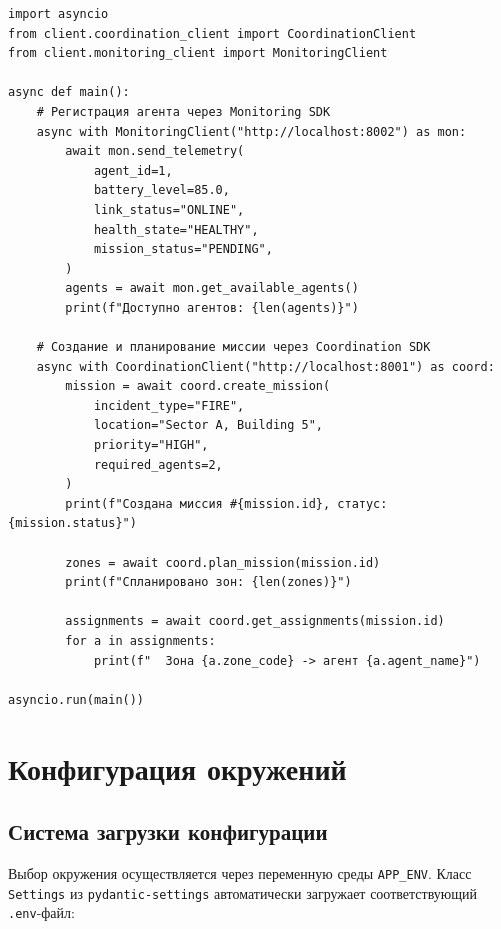 \documentclass[12pt,a4paper]{article}
\begin{document}
\begin{lstlisting}[caption={Использование CoordinationClient}]
import asyncio
from client.coordination_client import CoordinationClient
from client.monitoring_client import MonitoringClient

async def main():
    # Регистрация агента через Monitoring SDK
    async with MonitoringClient("http://localhost:8002") as mon:
        await mon.send_telemetry(
            agent_id=1,
            battery_level=85.0,
            link_status="ONLINE",
            health_state="HEALTHY",
            mission_status="PENDING",
        )
        agents = await mon.get_available_agents()
        print(f"Доступно агентов: {len(agents)}")

    # Создание и планирование миссии через Coordination SDK
    async with CoordinationClient("http://localhost:8001") as coord:
        mission = await coord.create_mission(
            incident_type="FIRE",
            location="Sector A, Building 5",
            priority="HIGH",
            required_agents=2,
        )
        print(f"Создана миссия #{mission.id}, статус: {mission.status}")

        zones = await coord.plan_mission(mission.id)
        print(f"Спланировано зон: {len(zones)}")

        assignments = await coord.get_assignments(mission.id)
        for a in assignments:
            print(f"  Зона {a.zone_code} -> агент {a.agent_name}")

asyncio.run(main())
\end{lstlisting}

\section{Конфигурация окружений}

\subsection{Система загрузки конфигурации}

Выбор окружения осуществляется через переменную среды \texttt{APP\_ENV}.
Класс \texttt{Settings} из \texttt{pydantic-settings} автоматически загружает
соответствующий \texttt{.env}-файл:
\end{document}
